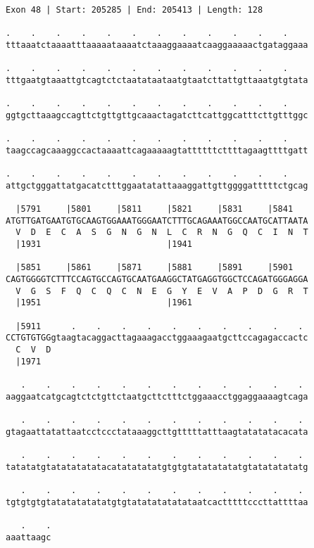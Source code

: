 \documentclass{article}
\begin{document}
\begin{Verbatim}[fontfamily=courier]
Exon 48 | Start: 205285 | End: 205413 | Length: 128

.    .    .    .    .    .    .    .    .    .    .    .    
tttaaatctaaaatttaaaaataaaatctaaaggaaaatcaaggaaaaactgataggaaa

.    .    .    .    .    .    .    .    .    .    .    .    
tttgaatgtaaattgtcagtctctaatataataatgtaatcttattgttaaatgtgtata

.    .    .    .    .    .    .    .    .    .    .    .    
ggtgcttaaagccagttctgttgttgcaaactagatcttcattggcatttcttgtttggc

.    .    .    .    .    .    .    .    .    .    .    .    
taagccagcaaaggccactaaaattcagaaaaagtattttttcttttagaagttttgatt

.    .    .    .    .    .    .    .    .    .    .    .    
attgctgggattatgacatctttggaatatattaaaggattgttggggatttttctgcag

  |5791     |5801     |5811     |5821     |5831     |5841   
ATGTTGATGAATGTGCAAGTGGAAATGGGAATCTTTGCAGAAATGGCCAATGCATTAATA
  V  D  E  C  A  S  G  N  G  N  L  C  R  N  G  Q  C  I  N  T
  |1931                         |1941                       

  |5851     |5861     |5871     |5881     |5891     |5901   
CAGTGGGGTCTTTCCAGTGCCAGTGCAATGAAGGCTATGAGGTGGCTCCAGATGGGAGGA
  V  G  S  F  Q  C  Q  C  N  E  G  Y  E  V  A  P  D  G  R  T
  |1951                         |1961                       

  |5911      .    .    .    .    .    .    .    .    .    . 
CCTGTGTGGgtaagtacaggacttagaaagacctggaaagaatgcttccagagaccactc
  C  V  D                                                   
  |1971                                                     

   .    .    .    .    .    .    .    .    .    .    .    . 
aaggaatcatgcagtctctgttctaatgcttctttctggaaacctggaggaaaagtcaga

   .    .    .    .    .    .    .    .    .    .    .    . 
gtagaattatattaatcctccctataaaggcttgtttttatttaagtatatatacacata

   .    .    .    .    .    .    .    .    .    .    .    . 
tatatatgtatatatatatacatatatatatgtgtgtatatatatatgtatatatatatg

   .    .    .    .    .    .    .    .    .    .    .    . 
tgtgtgtgtatatatatatatgtgtatatatatatataatcactttttcccttattttaa

   .    .
aaattaagc
\end{Verbatim}
\newpage
\end{document}

